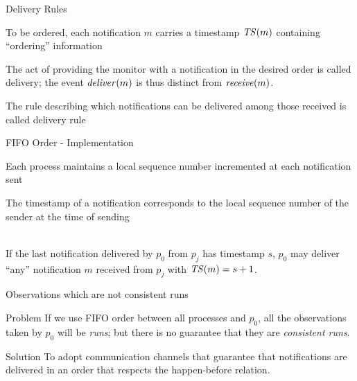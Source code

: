 \begin{frame}{Delivery Rules}

\BI
\item To be ordered, each notification $m$ carries a \alert{timestamp} $\mathit{TS}(m)$ 
  containing ``ordering'' information
\item The act of providing the monitor with a notification in the desired order
  is called \alert{delivery}; the event $\mathit{deliver}(m)$ is thus distinct from
  $\mathit{receive}(m)$.
\item The rule describing which notifications can be delivered among those 
  received is called \alert{delivery rule}
\EI

\end{frame}


\begin{frame}{FIFO Order - Implementation} 
	
\BI
\item Each process maintains a \alert{local sequence number} incremented at
  each notification sent
\item The timestamp of a notification corresponds to the local sequence number
  of the sender at the time of sending
\EI

\begin{definition}~\\
  If the last notification delivered by $p_0$ from $p_j$ has timestamp
  $s$, $p_0$ may deliver ``any'' notification $m$ received from $p_j$ with $\mathit{TS}(m)=s+1$.
\end{definition}

\end{frame}



\begin{frame}{Observations which are not consistent runs}

\begin{block}{Problem} 
If we use FIFO order between all processes and $p_0$, all the observations taken by $p_0$ will be \emph{runs};
but there is no guarantee that they are \emph{consistent runs}.
\end{block}

\pause
\bigskip
\begin{block}{Solution}
To adopt communication channels that guarantee that notifications are delivered
in an order that respects the happen-before relation.
\end{block}

\end{frame}

